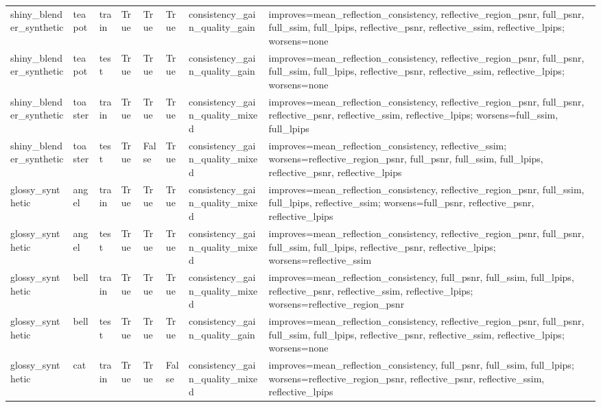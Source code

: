 \begin{tabular}{llllllll}
shiny\_blender\_synthetic & teapot & train & True & True & True & consistency\_gain\_quality\_gain & improves=mean\_reflection\_consistency, reflective\_region\_psnr, full\_psnr, full\_ssim, full\_lpips, reflective\_psnr, reflective\_ssim, reflective\_lpips; worsens=none \\
shiny\_blender\_synthetic & teapot & test & True & True & True & consistency\_gain\_quality\_gain & improves=mean\_reflection\_consistency, reflective\_region\_psnr, full\_psnr, full\_ssim, full\_lpips, reflective\_psnr, reflective\_ssim, reflective\_lpips; worsens=none \\
shiny\_blender\_synthetic & toaster & train & True & True & True & consistency\_gain\_quality\_mixed & improves=mean\_reflection\_consistency, reflective\_region\_psnr, full\_psnr, reflective\_psnr, reflective\_ssim, reflective\_lpips; worsens=full\_ssim, full\_lpips \\
shiny\_blender\_synthetic & toaster & test & True & False & True & consistency\_gain\_quality\_mixed & improves=mean\_reflection\_consistency, reflective\_ssim; worsens=reflective\_region\_psnr, full\_psnr, full\_ssim, full\_lpips, reflective\_psnr, reflective\_lpips \\
glossy\_synthetic & angel & train & True & True & True & consistency\_gain\_quality\_mixed & improves=mean\_reflection\_consistency, reflective\_region\_psnr, full\_ssim, full\_lpips, reflective\_ssim; worsens=full\_psnr, reflective\_psnr, reflective\_lpips \\
glossy\_synthetic & angel & test & True & True & True & consistency\_gain\_quality\_mixed & improves=mean\_reflection\_consistency, reflective\_region\_psnr, full\_psnr, full\_ssim, full\_lpips, reflective\_psnr, reflective\_lpips; worsens=reflective\_ssim \\
glossy\_synthetic & bell & train & True & True & True & consistency\_gain\_quality\_mixed & improves=mean\_reflection\_consistency, full\_psnr, full\_ssim, full\_lpips, reflective\_psnr, reflective\_ssim, reflective\_lpips; worsens=reflective\_region\_psnr \\
glossy\_synthetic & bell & test & True & True & True & consistency\_gain\_quality\_gain & improves=mean\_reflection\_consistency, reflective\_region\_psnr, full\_psnr, full\_ssim, full\_lpips, reflective\_psnr, reflective\_ssim, reflective\_lpips; worsens=none \\
glossy\_synthetic & cat & train & True & True & False & consistency\_gain\_quality\_mixed & improves=mean\_reflection\_consistency, full\_psnr, full\_ssim, full\_lpips; worsens=reflective\_region\_psnr, reflective\_psnr, reflective\_ssim, reflective\_lpips \\

\end{tabular}
